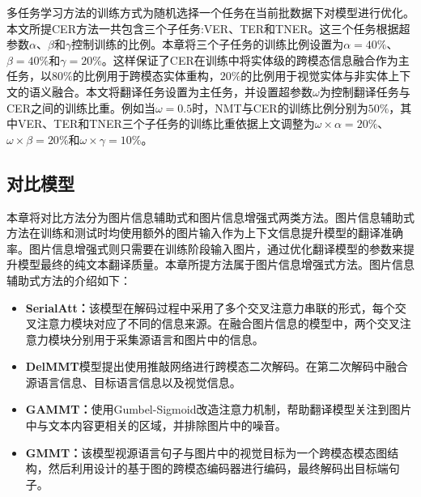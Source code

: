 多任务学习方法的训练方式为随机选择一个任务在当前批数据下对模型进行优化。本文所提CER方法一共包含三个子任务:VER、TER和TNER。这三个任务根据超参数$\alpha$、$\beta$和$\gamma$控制训练的比例。本章将三个子任务的训练比例设置为$\alpha=40\%$、$\beta=40\%$和$\gamma=20\%$。这样保证了CER在训练中将实体级的跨模态信息融合作为主任务，以$80\%$的比例用于跨模态实体重构，$20\%$的比例用于视觉实体与非实体上下文的语义融合。本文将翻译任务设置为主任务，并设置超参数$\omega$为控制翻译任务与CER之间的训练比重。例如当$\omega=0.5$时，NMT与CER的训练比例分别为$50\%$，其中VER、TER和TNER三个子任务的训练比重依据上文调整为$\omega\times\alpha=20\%$、$\omega\times\beta=20\%$和$\omega\times\gamma=10\%$。



\subsection{对比模型}
\label{sec:4_comparison}

本章将对比方法分为图片信息辅助式和图片信息增强式两类方法。图片信息辅助式方法在训练和测试时均使用额外的图片输入作为上下文信息提升模型的翻译准确率。图片信息增强式则只需要在训练阶段输入图片，通过优化翻译模型的参数来提升模型最终的纯文本翻译质量。本章所提方法属于图片信息增强式方法。图片信息辅助式方法的介绍如下：

\begin{itemize}

\item \textbf{SerialAtt：}该模型在解码过程中采用了多个交叉注意力串联的形式，每个交叉注意力模块对应了不同的信息来源。在融合图片信息的模型中，两个交叉注意力模块分别用于采集源语言和图片中的信息。

\item \textbf{DelMMT}模型提出使用推敲网络进行跨模态二次解码。在第二次解码中融合源语言信息、目标语言信息以及视觉信息。

\item \textbf{GAMMT：}使用Gumbel-Sigmoid改造注意力机制，帮助翻译模型关注到图片中与文本内容更相关的区域，并排除图片中的噪音。

\item \textbf{GMMT：}该模型视源语言句子与图片中的视觉目标为一个跨模态模态图结构，然后利用设计的基于图的跨模态编码器进行编码，最终解码出目标端句子。
\end{itemize}

